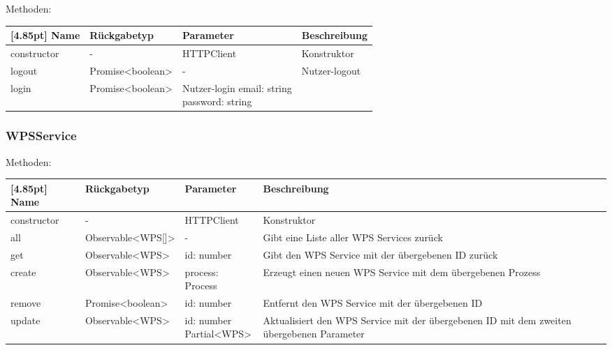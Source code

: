                 Methoden:
        		\begin{center}
        		    \setlength\tabcolsep{5pt}
                	\renewcommand{\arraystretch}{1.5}
                    	\begin{tabularx}{\textwidth}{|l|l|l|X|}
                    	\hline
                    	\rowcolor[gray]{0.75}[4.85pt]
                		Name & Rückgabetyp & Parameter & Beschreibung \\ \hline 
                        constructor & - & HTTPClient & Konstruktor \\ \hline
                        logout & Promise<boolean> & - & Nutzer-logout \\ \hline
                        login & Promise<boolean> & Nutzer-login \thead{email: string\\password: string} & \\ \hline
                    	\end{tabularx}
        		\end{center}
            
            
            \subsubsection{WPSService}
                
                Methoden:
        		\begin{center}
                \setlength\tabcolsep{5pt}
                	\renewcommand{\arraystretch}{1.5}
                    	\begin{tabularx}{\textwidth}{|l|l|l|X|}
                    	\hline
                    	\rowcolor[gray]{0.75}[4.85pt]
                		Name & Rückgabetyp & Parameter & Beschreibung \\ \hline 
                        constructor & - & HTTPClient & Konstruktor\\ \hline
                        all & Observable<WPS[]> & - & Gibt eine Liste aller WPS Services zurück\\ \hline
                        get & Observable<WPS> & id: number & Gibt den WPS Service mit der übergebenen ID zurück \\ \hline
                        create & Observable<WPS> & process: Process & Erzeugt einen neuen WPS Service mit dem übergebenen Prozess \\ \hline
                        remove & Promise<boolean> & id: number & Entfernt den WPS Service mit der übergebenen ID \\ \hline
                        update & Observable<WPS> & \thead{id: number\\Partial<WPS>} & Aktualisiert den WPS Service mit der übergebenen ID mit dem zweiten übergebenen Parameter \\ \hline
                        \end{tabularx}
        		\end{center}
            
